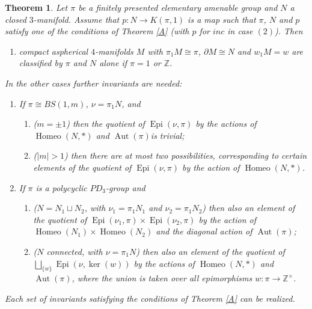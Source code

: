 \documentclass[12pt]{amsart}
\newtheorem{theorem}{Theorem}
\theoremstyle{definition}
\newcommand{\Z}{\mathbb Z}
\DeclareMathOperator{\Aut}{Aut}
\DeclareMathOperator{\Epi}{Epi}
\DeclareMathOperator{\Homeo}{Homeo}
\begin{document}
\begin{theorem}
\label{thmD}
Let $\pi$ be a finitely presented elementary amenable group and $N$ a closed $3$-manifold.
Assume that $p:N\to{K(\pi,1)}$ is a map such that $\pi$, $N$ and $p$ 
satisfy one of the conditions of Theorem \ref{A} (with $p$ for $inc$ in case $(2)$).
Then 
\begin{enumerate}
\item{} compact aspherical $4$-manifolds $M$ with $\pi_1M\cong\pi$, $\partial{M}\cong{N}$
and $w_1M=w$ are classified by $\pi$ and $N$ alone if 
$\pi=1$ or $\Z$.
\end{enumerate}
In the other cases further invariants are needed:

\begin{enumerate}
\addtocounter{enumi}{1}
\item{}If $\pi\cong{BS(1,m)}$, $\nu=\pi_1N$, and
\begin{enumerate}
\item($m=\pm1$) then  the quotient of $\Epi(\nu,\pi)$  by the actions of $\Homeo(N,*)$ and $\Aut(\pi)$is trivial;
\item($|m|>1$) then there are at most two possibilities, corresponding to certain elements of the quotient of $\Epi(\nu,\pi)$ by the action of $\Homeo(N,*)$.  
\end{enumerate}
\item{If} $\pi$ is a polycyclic $PD_3$-group and
\begin{enumerate}
\item($N=N_1\sqcup{N_2}$, with $\nu_1=\pi_1N_1$ and $\nu_2=\pi_1N_2$)
then also an element of the quotient of 
$\Epi(\nu_1,\pi)\times{\Epi(\nu_2,\pi)}$ by the action of $\Homeo(N_1)\times{\Homeo(N_2)}$ and the diagonal action of $\Aut(\pi)$; 
\item($N$ connected, with $\nu=\pi_1N$) then also an element of the quotient of\\
 $\bigsqcup_{\{w\}}\Epi(\nu,\ker(w))$ 
by the actions of $\Homeo(N,*)$ and $\Aut(\pi)$, where the union is taken over all  epimorphisms $w:\pi\to\Z^\times$.
\end{enumerate}
\end{enumerate}
Each set of invariants satisfying the conditions of Theorem \ref{A} can be realized.
\end{theorem}
\end{document}
